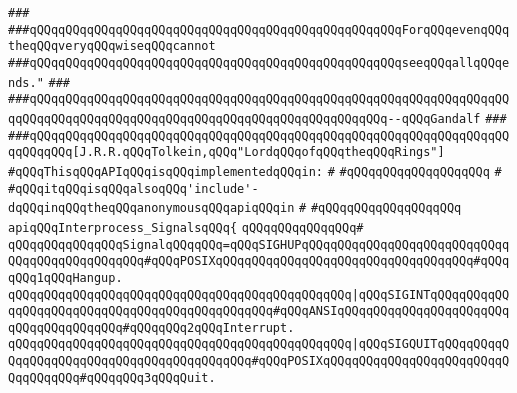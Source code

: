 \verb|###|\newline
\verb|###qQQqqQQqqQQqqQQqqQQqqQQqqQQqqQQqqQQqqQQqqQQqqQQqqQQqForqQQqevenqQQqtheqQQqveryqQQqwiseqQQqcannot|\newline
\verb|###qQQqqQQqqQQqqQQqqQQqqQQqqQQqqQQqqQQqqQQqqQQqqQQqqQQqseeqQQqallqQQqends."|\newline
\verb|###|\newline
\verb|###qQQqqQQqqQQqqQQqqQQqqQQqqQQqqQQqqQQqqQQqqQQqqQQqqQQqqQQqqQQqqQQqqQQqqQQqqQQqqQQqqQQqqQQqqQQqqQQqqQQqqQQqqQQqqQQqqQQqqQQq--qQQqGandalf|\newline
\verb|###|\newline
\verb|###qQQqqQQqqQQqqQQqqQQqqQQqqQQqqQQqqQQqqQQqqQQqqQQqqQQqqQQqqQQqqQQqqQQqqQQqqQQq[J.R.R.qQQqTolkein,qQQq"LordqQQqofqQQqtheqQQqRings"]|\newline
\newline
\newline
\newline
\verb|#qQQqThisqQQqAPIqQQqisqQQqimplementedqQQqin:|\newline
\verb|#|\newline
\verb|#qQQqqQQqqQQqqQQqqQQq|\newline
\verb|#|\newline
\verb|#qQQqitqQQqisqQQqalsoqQQq'include'-dqQQqinqQQqtheqQQqanonymousqQQqapiqQQqin|\newline
\verb|#|\newline
\verb|#qQQqqQQqqQQqqQQqqQQq|\newline
\newline
\verb|apiqQQqInterprocess_SignalsqQQq{|\newline
\verb|qQQqqQQqqQQqqQQq#|\newline
\verb|qQQqqQQqqQQqqQQqSignalqQQqqQQq=qQQqSIGHUPqQQqqQQqqQQqqQQqqQQqqQQqqQQqqQQqqQQqqQQqqQQqqQQq#qQQqPOSIXqQQqqQQqqQQqqQQqqQQqqQQqqQQqqQQqqQQq#qQQqqQQq1qQQqHangup.|\newline
\verb|qQQqqQQqqQQqqQQqqQQqqQQqqQQqqQQqqQQqqQQqqQQqqQQq|\verb#|qQQqSIGINTqQQqqQQqqQQqqQQqqQQqqQQqqQQqqQQqqQQqqQQqqQQqqQQq#\verb|#qQQqANSIqQQqqQQqqQQqqQQqqQQqqQQqqQQqqQQqqQQqqQQq#qQQqqQQq2qQQqInterrupt.|\newline
\verb|qQQqqQQqqQQqqQQqqQQqqQQqqQQqqQQqqQQqqQQqqQQqqQQq|\verb#|qQQqSIGQUITqQQqqQQqqQQqqQQqqQQqqQQqqQQqqQQqqQQqqQQqqQQq#\verb|#qQQqPOSIXqQQqqQQqqQQqqQQqqQQqqQQqqQQqqQQqqQQq#qQQqqQQq3qQQqQuit.|\newline
